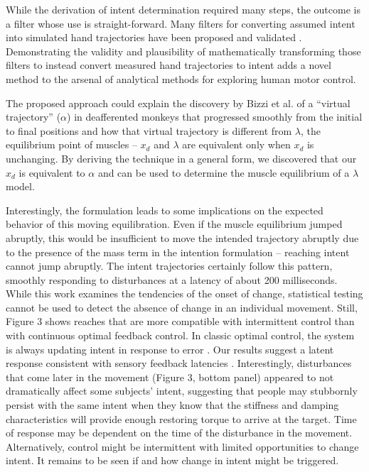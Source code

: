 \documentclass[10pt]{article}
\begin{document}
While the derivation of intent determination required many steps, the outcome is a filter whose use is straight-forward. Many filters for converting assumed intent into simulated hand trajectories have been proposed and validated \cite{shadmehr1994adaptive, franklin2003adaptation, burdet2006stability}. Demonstrating the validity and plausibility of mathematically transforming those filters to instead convert measured hand trajectories to intent adds a novel method to the arsenal of analytical methods for exploring human motor control.

The proposed approach could explain the discovery by Bizzi et al. \cite{bizzi1984posture} of a ``virtual trajectory'' ($\alpha$) in deafferented monkeys that progressed smoothly from the initial to final positions and how that virtual trajectory is different from $\lambda$, the equilibrium point of muscles -- $x_d$ and $\lambda$ are equivalent only when $x_d$ is unchanging.  By deriving the technique in a general form, we discovered that our $x_d$ is equivalent to $\alpha$ and can be used to determine the muscle equilibrium of a $\lambda$ model. 

Interestingly, the formulation leads to some implications on the expected behavior of this moving equilibration. Even if the muscle equilibrium jumped abruptly, this would be insufficient to move the intended trajectory abruptly due to the presence of the mass term in the intention formulation -- reaching intent cannot jump abruptly. The intent trajectories certainly follow this pattern, smoothly responding to disturbances at a latency of about 200 milliseconds. While this work examines the tendencies of the onset of change, statistical testing cannot be used to detect the absence of change in an individual movement. Still, Figure 3 shows reaches that are more compatible with intermittent control than with continuous optimal feedback control. In classic optimal control, the system is always updating intent in response to error \cite{todorov2002optimal}. Our results suggest a latent response consistent with sensory feedback latencies \cite{pruszynski2012optimal}. Interestingly, disturbances that come later in the movement (Figure 3, bottom panel) appeared to not dramatically affect some subjects' intent, suggesting that people may stubbornly persist with the same intent when they know that the stiffness and damping characteristics will provide enough restoring torque to arrive at the target. Time of response may be dependent on the time of the disturbance in the movement. Alternatively, control might be intermittent \cite{gawthrop2011intermittent} with limited opportunities to change intent. It remains to be seen if and how change in intent might be triggered. 
\end{document}
